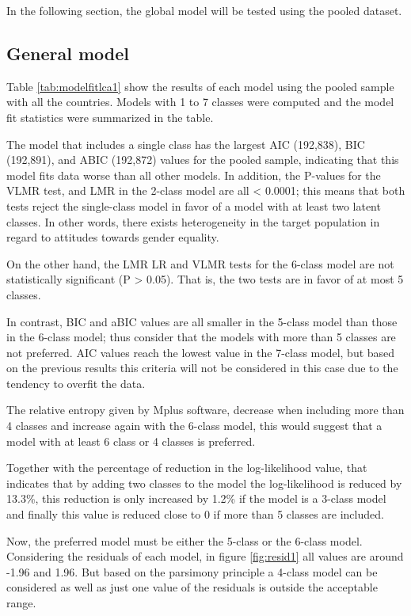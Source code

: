 \documentclass[12pt,a4paper,oneside]{reedthesis}
\begin{document}
In the following section, the global model will be tested using the pooled dataset.

\hypertarget{general-model}{%
\subsection{General model}\label{general-model}}

Table \ref{tab:modelfitlca1} show the results of each model using the pooled sample with all the countries. Models with 1 to 7 classes were computed and the model fit statistics were summarized in the table.

The model that includes a single class has the largest AIC (192,838), BIC (192,891), and ABIC (192,872) values for the pooled sample, indicating that this model fits data worse than all other models. In addition, the P-values for the VLMR test, and LMR in the 2-class model are all \textless{} 0.0001; this means that both tests reject the single-class model in favor of a model with at least two latent classes. In other words, there exists heterogeneity in the target population in regard to attitudes towards gender equality.

On the other hand, the LMR LR and VLMR tests for the 6-class model are not statistically significant (P \textgreater{} 0.05). That is, the two tests are in favor of at most 5 classes.

In contrast, BIC and aBIC values are all smaller in the 5-class model than those in the 6-class model; thus consider that the models with more than 5 classes are not preferred. AIC values reach the lowest value in the 7-class model, but based on the previous results this criteria will not be considered in this case due to the tendency to overfit the data.

The relative entropy given by Mplus software, decrease when including more than 4 classes and increase again with the 6-class model, this would suggest that a model with at least 6 class or 4 classes is preferred.

Together with the percentage of reduction in the log-likelihood value, that indicates that by adding two classes to the model the log-likelihood is reduced by 13.3\%, this reduction is only increased by 1.2\% if the model is a 3-class model and finally this value is reduced close to 0 if more than 5 classes are included.

Now, the preferred model must be either the 5-class or the 6-class model. Considering the residuals of each model, in figure \ref{fig:resid1} all values are around -1.96 and 1.96. But based on the parsimony principle a 4-class model can be considered as well as just one value of the residuals is outside the acceptable range.
\end{document}
